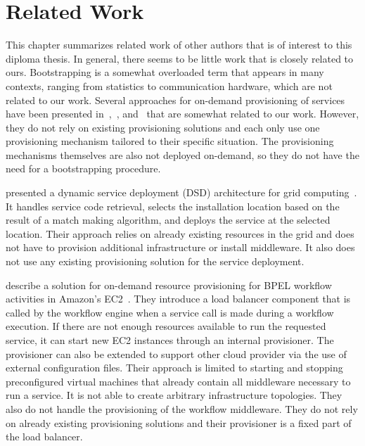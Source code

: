 \chapter{Related Work}
\label{related}

This chapter summarizes related work of other authors that is of interest to this diploma thesis.
In general, there seems to be little work that is closely related to ours.
Bootstrapping is a somewhat overloaded term that appears in many contexts, ranging from statistics to communication hardware, which are not related to our work.
Several approaches for on-demand provisioning of services have been presented in~\autocite{applyingwebservice},~\autocite{ondemandbpel}, and~\autocite{provisioning:architecture} that are somewhat related to our work.
However, they do not rely on existing provisioning solutions and each only use one provisioning mechanism tailored to their specific situation.
The provisioning mechanisms themselves are also not deployed on-demand, so they do not have the need for a bootstrapping procedure.

\citeauthor*{applyingwebservice} presented a dynamic service deployment (DSD) architecture for grid computing~\autocite{applyingwebservice}.
It handles service code retrieval, selects the installation location based on the result of a match making algorithm, and deploys the service at the selected location.
Their approach relies on already existing resources in the grid and does not have to provision additional infrastructure or install middleware.
It also does not use any existing provisioning solution for the service deployment.

\citeauthor*{ondemandbpel} describe a solution for on-demand resource provisioning for BPEL workflow activities in Amazon's EC2~\autocite{ondemandbpel}.
They introduce a load balancer component that is called by the workflow engine when a service call is made during a workflow execution.
If there are not enough resources available to run the requested service, it can start new EC2 instances through an internal provisioner.
The provisioner can also be extended to support other cloud provider via the use of external configuration files.
Their approach is limited to starting and stopping preconfigured virtual machines that already contain all middleware necessary to run a service.
It is not able to create arbitrary infrastructure topologies.
They also do not handle the provisioning of the workflow middleware.
They do not rely on already existing provisioning solutions and their provisioner is a fixed part of the load balancer.

